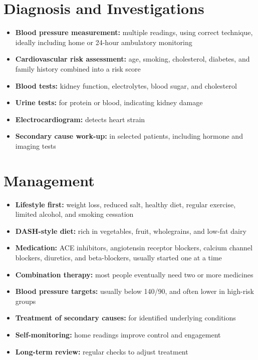 \section*{Diagnosis and Investigations}
\begin{itemize}
    \item \textbf{Blood pressure measurement:} multiple readings, using correct technique, ideally including home or 24-hour ambulatory monitoring
    \item \textbf{Cardiovascular risk assessment:} age, smoking, cholesterol, diabetes, and family history combined into a risk score
    \item \textbf{Blood tests:} kidney function, electrolytes, blood sugar, and cholesterol
    \item \textbf{Urine tests:} for protein or blood, indicating kidney damage
    \item \textbf{Electrocardiogram:} detects heart strain
    \item \textbf{Secondary cause work-up:} in selected patients, including hormone and imaging tests
\end{itemize}

\section*{Management}
\begin{itemize}
    \item \textbf{Lifestyle first:} weight loss, reduced salt, healthy diet, regular exercise, limited alcohol, and smoking cessation
    \item \textbf{DASH-style diet:} rich in vegetables, fruit, wholegrains, and low-fat dairy
    \item \textbf{Medication:} ACE inhibitors, angiotensin receptor blockers, calcium channel blockers, diuretics, and beta-blockers, usually started one at a time
    \item \textbf{Combination therapy:} most people eventually need two or more medicines
    \item \textbf{Blood pressure targets:} usually below 140/90, and often lower in high-risk groups
    \item \textbf{Treatment of secondary causes:} for identified underlying conditions
    \item \textbf{Self-monitoring:} home readings improve control and engagement
    \item \textbf{Long-term review:} regular checks to adjust treatment
\end{itemize}

